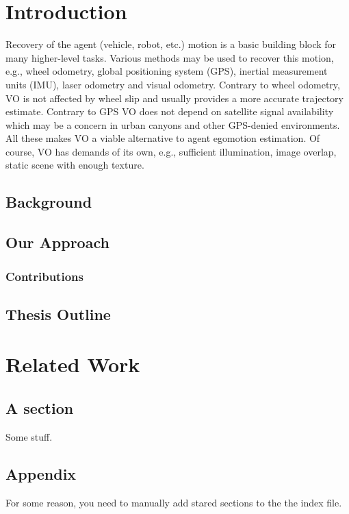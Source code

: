 \documentclass[MSc,beforeExam]{iitcsthesis}
\begin{document}
\chapter{Introduction}

Recovery of the agent (vehicle, robot, etc.) motion is a basic
building block for many higher-level tasks. Various methods may be
used to recover this motion, e.g., wheel odometry, global positioning
system (GPS), inertial measurement units (IMU), laser odometry and
visual odometry. Contrary to wheel odometry, VO is not affected by
wheel slip and usually provides a more accurate trajectory
estimate. Contrary to GPS VO does not depend on satellite signal
availability which may be a concern in urban canyons and other
GPS-denied environments. All these makes VO a viable alternative to
agent egomotion estimation. Of course, VO has demands of its own,
e.g., sufficient illumination, image overlap, static scene with enough
texture.

\section{Background}

\section{Our Approach}
\subsection{Contributions}
\section{Thesis Outline}

\chapter{Related Work}


\section{A section}

Some stuff.

\section*{Appendix}
For some reason, you need to manually add stared sections to the the index file.

{}



\end{document}
